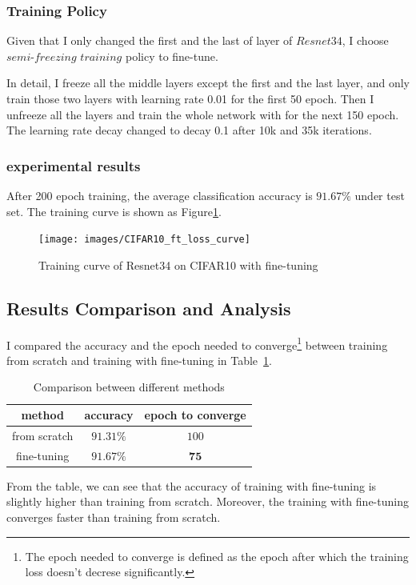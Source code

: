 \documentclass[10pt,twocolumn,letterpaper]{article}
\begin{document}
    \subsubsection{Training Policy}
    Given that I only changed the first and the last of layer of $Resnet34$, I choose $semi$-$freezing$ $training$ policy to fine-tune.
    \par In detail, I freeze all the middle layers except the first and the last layer, and only train those two layers with learning rate 0.01
    for the first 50 epoch.
    Then I unfreeze all the layers and train the whole network with for the next 150 epoch.
    The learning rate decay changed to decay 0.1 after 10k and 35k iterations.

    \subsubsection{experimental results}
    After 200 epoch training, the average classification accuracy is $\mathbf{91.67\%}$ under test set.
    The training curve is shown as Figure\ref{fig:train_curve_finetune}.
    \begin{center}
        \begin{figure}
            \texttt{[image: images/CIFAR10\_ft\_loss\_curve]}
            \caption{Training curve of Resnet34 on CIFAR10 with fine-tuning}
            \label{fig:train_curve_finetune}
        \end{figure}
    \end{center}

    \subsection{Results Comparison and Analysis}
    I compared the accuracy and the epoch needed to converge\footnote{The epoch needed to converge is defined as the epoch after which the training loss doesn't decrese significantly.} between training from scratch and training with fine-tuning in Table~\ref{tab:cifar10_table}.
    \begin{table}
        \centering
        \caption{Comparison between different methods}
        \begin{tabular}{c c c}
            \hline
            method       & accuracy           & epoch to converge \\
            \hline
            from scratch & $91.31\%$          & $100$             \\
            fine-tuning  & $\mathbf{91.67\%}$ & $\mathbf{75}$     \\
            \hline
        \end{tabular}
        \label{tab:cifar10_table}
    \end{table}
    \par From the table, we can see that the accuracy of training with fine-tuning is slightly higher than training from scratch. Moreover, the training with fine-tuning converges faster than training from scratch.
\end{document}
